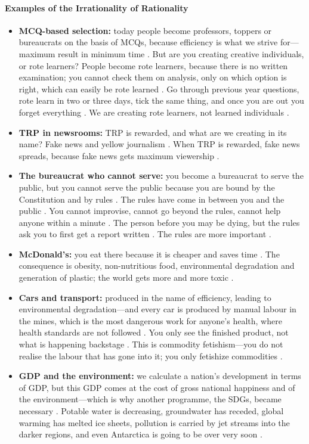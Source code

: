 \paragraph{Examples of the Irrationality of Rationality}
\begin{ExampleBox}
\begin{itemize}
    \item \textbf{MCQ-based selection:} today people become professors, toppers or bureaucrats on the basis of MCQs, because efficiency is what we strive for---maximum result in minimum time . But are you creating creative individuals, or rote learners? People become rote learners, because there is no written examination; you cannot check them on analysis, only on which option is right, which can easily be rote learned . Go through previous year questions, rote learn in two or three days, tick the same thing, and once you are out you forget everything . We are creating rote learners, not learned individuals .
    \item \textbf{TRP in newsrooms:} TRP is rewarded, and what are we creating in its name? Fake news and yellow journalism . When TRP is rewarded, fake news spreads, because fake news gets maximum viewership .
    \item \textbf{The bureaucrat who cannot serve:} you become a bureaucrat to serve the public, but you cannot serve the public because you are bound by the Constitution and by rules . The rules have come in between you and the public . You cannot improvise, cannot go beyond the rules, cannot help anyone within a minute . The person before you may be dying, but the rules ask you to first get a report written . The rules are more important .
    \item \textbf{McDonald's:} you eat there because it is cheaper and saves time . The consequence is obesity, non-nutritious food, environmental degradation and generation of plastic; the world gets more and more toxic .
    \item \textbf{Cars and transport:} produced in the name of efficiency, leading to environmental degradation---and every car is produced by manual labour in the mines, which is the most dangerous work for anyone's health, where health standards are not followed . You only see the finished product, not what is happening backstage . This is commodity fetishism---you do not realise the labour that has gone into it; you only fetishize commodities .
    \item \textbf{GDP and the environment:} we calculate a nation's development in terms of GDP, but this GDP comes at the cost of gross national happiness and of the environment---which is why another programme, the SDGs, became necessary . Potable water is decreasing, groundwater has receded, global warming has melted ice sheets, pollution is carried by jet streams into the darker regions, and even Antarctica is going to be over very soon .
\end{itemize}
\end{ExampleBox}

